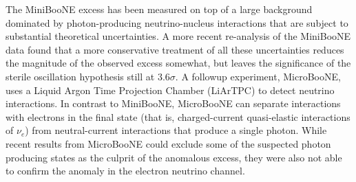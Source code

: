 The MiniBooNE excess has been measured on top of a large background dominated by photon-producing neutrino-nucleus interactions that are subject to substantial theoretical uncertainties. A more recent re-analysis of the MiniBooNE data found that a more conservative treatment of all these uncertainties reduces the magnitude of the observed excess somewhat, but leaves the significance of the sterile oscillation hypothesis still at $3.6\sigma$\cite{Giunti:2019sag}. A followup experiment, MicroBooNE\cite{MicroBooNE:2016pwy}, uses a Liquid Argon Time Projection Chamber (LiArTPC) to detect neutrino interactions. In contrast to MiniBooNE, MicroBooNE can separate interactions with electrons in the final state (that is, charged-current quasi-elastic interactions of $\nu_e$) from neutral-current interactions that produce a single photon. While recent results from MicroBooNE could exclude some of the suspected photon producing states as the culprit of the anomalous excess\cite{MicroBooNE:2021zai}, they were also not able to confirm the anomaly in the electron neutrino channel\cite{MicroBooNE:2022wdf}.

